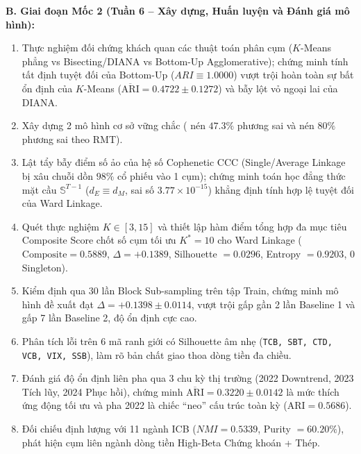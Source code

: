 \documentclass[12pt,a4paper,oneside,openany]{report}
\begin{document}
\textbf{B. Giai đoạn Mốc 2 (Tuần 6 -- Xây dựng, Huấn luyện và Đánh giá mô hình):}
\begin{enumerate}
  \item Thực nghiệm đối chứng khách quan các thuật toán phân cụm ($K$-Means phẳng vs Bisecting/DIANA vs Bottom-Up Agglomerative); chứng minh tính tất định tuyệt đối của Bottom-Up ($ARI \equiv 1.0000$) vượt trội hoàn toàn sự bất ổn định của $K$-Means ($\overline{\text{ARI}} = 0.4722 \pm 0.1272$) và bẫy lột vỏ ngoại lai của DIANA.
  \item Xây dựng 2 mô hình cơ sở vững chắc ( nén $47.3\%$ phương sai và  nén $80\%$ phương sai theo RMT).
  \item Lật tẩy bẫy điểm số ảo của hệ số Cophenetic CCC (Single/Average Linkage bị xâu chuỗi dồn $98\%$ cổ phiếu vào 1 cụm); chứng minh toán học đẳng thức mặt cầu $\mathbb{S}^{T-1}$ ($d_E \equiv d_M$, sai số $3.77 \times 10^{-15}$) khẳng định tính hợp lệ tuyệt đối của Ward Linkage.
  \item Quét thực nghiệm $K \in [3, 15]$ và thiết lập hàm điểm tổng hợp đa mục tiêu Composite Score chốt số cụm tối ưu $K^* = 10$ cho Ward Linkage ($\text{Composite} = 0.5889$, $\Delta = +0.1389$, Silhouette $= 0.0296$, Entropy $= 0.9203$, 0 Singleton).
  \item Kiểm định qua 30 lần Block Sub-sampling trên tập Train, chứng minh mô hình đề xuất đạt $\Delta = +0.1398 \pm 0.0114$, vượt trội gấp gần 2 lần Baseline 1 và gấp 7 lần Baseline 2, độ ổn định cực cao.
  \item Phân tích lỗi trên 6 mã ranh giới có Silhouette âm nhẹ (\texttt{TCB, SBT, CTD, VCB, VIX, SSB}), làm rõ bản chất giao thoa dòng tiền đa chiều.
  \item Đánh giá độ ổn định liên pha qua 3 chu kỳ thị trường (2022 Downtrend, 2023 Tích lũy, 2024 Phục hồi), chứng minh $\overline{\text{ARI}} = 0.3220 \pm 0.0142$ là mức thích ứng động tối ưu và pha 2022 là chiếc ``neo'' cấu trúc toàn kỳ ($\text{ARI} = 0.5686$).
  \item Đối chiếu định lượng với 11 ngành ICB ($NMI = 0.5339$, Purity $= 60.20\%$), phát hiện cụm liên ngành dòng tiền High-Beta Chứng khoán + Thép.
\end{enumerate}
\end{document}
